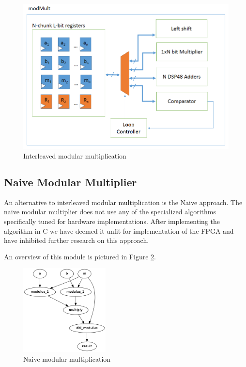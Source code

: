 \documentclass[12pt]{article}
\begin{document}
\begin{figure}
  \begin{centering}
    \includegraphics[width=\textwidth]{modmult.png}
    \caption{Interleaved modular multiplication}
    \label{fig-inter}
  \end{centering}
\end{figure}

\subsection{Naive Modular Multiplier}
An alternative to interleaved modular multiplication is the Naive approach.
The naive modular multiplier does not use any of the specialized algorithms
specifically tuned for hardware implementations.  After implementing the algorithm in C we have deemed it unfit for implementation of the FPGA and have inhibited further research on this approach.  


An overview of this module is pictured in Figure \ref{fig-naive}.

\begin{figure}
  \begin{centering}
    \includegraphics[width=0.4\textwidth]{modMultGraph.png}
    \caption{Naive modular multiplication}
    \label{fig-naive}
  \end{centering}
\end{figure}
\end{document}
